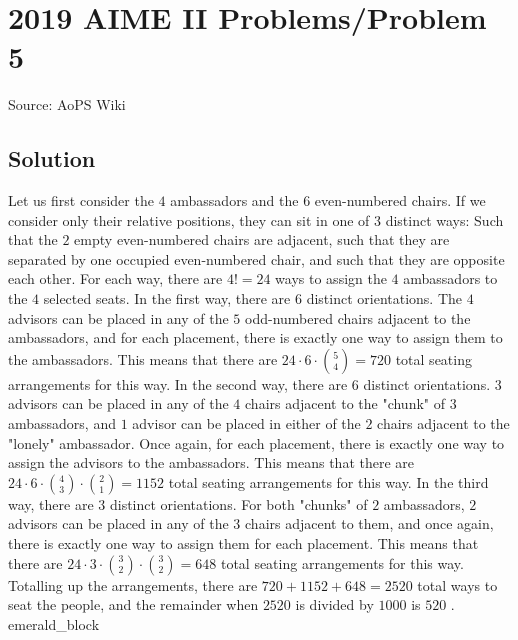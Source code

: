\documentclass[12pt]{article}
\begin{document}
\section*{{2019 AIME II Problems/Problem 5}}
Source: AoPS Wiki

\subsection*{Solution}
Let us first consider the $4$ ambassadors and the $6$ even-numbered chairs. If we consider only their relative positions, they can sit in one of $3$ distinct ways: Such that the $2$ empty even-numbered chairs are adjacent, such that they are separated by one occupied even-numbered chair, and such that they are opposite each other. For each way, there are $4!=24$ ways to assign the $4$ ambassadors to the $4$ selected seats. In the first way, there are $6$ distinct orientations. The $4$ advisors can be placed in any of the $5$ odd-numbered chairs adjacent to the ambassadors, and for each placement, there is exactly one way to assign them to the ambassadors. This means that there are $24\cdot6\cdot\binom{5}{4}=720$ total seating arrangements for this way. In the second way, there are $6$ distinct orientations. $3$ advisors can be placed in any of the $4$ chairs adjacent to the "chunk" of $3$ ambassadors, and $1$ advisor can be placed in either of the $2$ chairs adjacent to the "lonely" ambassador. Once again, for each placement, there is exactly one way to assign the advisors to the ambassadors. This means that there are $24\cdot6\cdot\binom{4}{3}\cdot\binom{2}{1}=1152$ total seating arrangements for this way. In the third way, there are $3$ distinct orientations. For both "chunks" of $2$ ambassadors, $2$ advisors can be placed in any of the $3$ chairs adjacent to them, and once again, there is exactly one way to assign them for each placement. This means that there are $24\cdot3\cdot\binom{3}{2}\cdot\binom{3}{2}=648$ total seating arrangements for this way. Totalling up the arrangements, there are $720+1152+648=2520$ total ways to seat the people, and the remainder when $2520$ is divided by $1000$ is $\boxed{520}$ . ~ emerald_block
\end{document}
